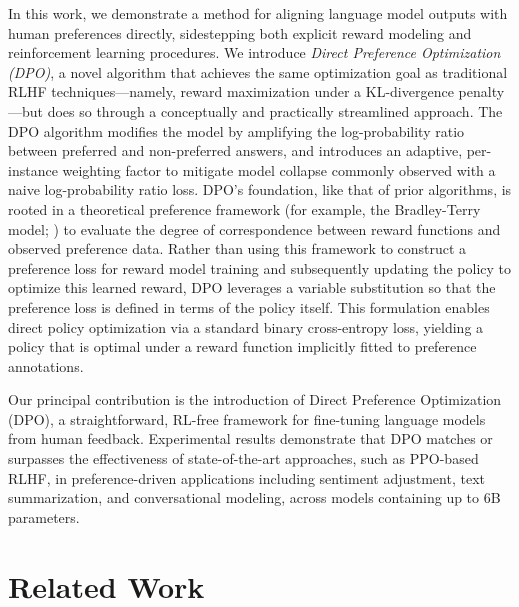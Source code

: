 In this work, we demonstrate a method for aligning language model outputs with human preferences directly, sidestepping both explicit reward modeling and reinforcement learning procedures. We introduce \textit{Direct Preference Optimization (DPO)}, a novel algorithm that achieves the same optimization goal as traditional RLHF techniques—namely, reward maximization under a KL-divergence penalty—but does so through a conceptually and practically streamlined approach. The DPO algorithm modifies the model by amplifying the log-probability ratio between preferred and non-preferred answers, and introduces an adaptive, per-instance weighting factor to mitigate model collapse commonly observed with a naive log-probability ratio loss. DPO’s foundation, like that of prior algorithms, is rooted in a theoretical preference framework (for example, the Bradley-Terry model; \cite{bradley1952rankanalysis}) to evaluate the degree of correspondence between reward functions and observed preference data. Rather than using this framework to construct a preference loss for reward model training and subsequently updating the policy to optimize this learned reward, DPO leverages a variable substitution so that the preference loss is defined in terms of the policy itself. This formulation enables direct policy optimization via a standard binary cross-entropy loss, yielding a policy that is optimal under a reward function implicitly fitted to preference annotations.

Our principal contribution is the introduction of Direct Preference Optimization (DPO), a straightforward, RL-free framework for fine-tuning language models from human feedback. Experimental results demonstrate that DPO matches or surpasses the effectiveness of state-of-the-art approaches, such as PPO-based RLHF, in preference-driven applications including sentiment adjustment, text summarization, and conversational modeling, across models containing up to 6B parameters.

\section{Related Work}

